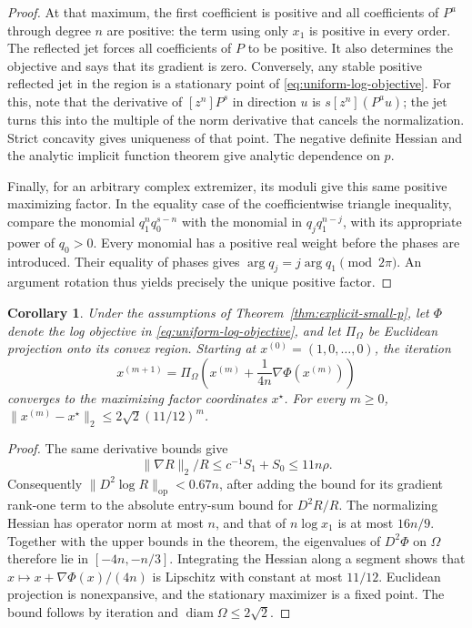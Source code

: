 \documentclass[11pt]{article}
\newtheorem{corollary}[theorem]{Corollary}
\begin{document}
\begin{proof}
At that maximum, the first coefficient is positive and all
coefficients of \(P^a\) through degree \(n\) are positive:
the term using only \(x_1\) is positive in every order.
The reflected jet forces all coefficients of \(P\) to be
positive. It also determines the objective and says that its
gradient is zero. Conversely, any stable positive reflected
jet in the region is a stationary point of
\eqref{eq:uniform-log-objective}. For this, note that the
derivative of \([z^n]P^s\) in direction \(u\) is
\(s[z^n](P^a u)\); the jet turns this into the multiple of
the norm derivative that cancels the normalization.
Strict concavity gives uniqueness of that point.
The negative definite Hessian and the analytic implicit
function theorem give analytic dependence on \(p\).

Finally, for an arbitrary complex extremizer, its moduli
give this same positive maximizing factor. In the equality
case of the coefficientwise triangle inequality, compare
the monomial \(q_1^n q_0^{s-n}\) with the monomial in
\(q_jq_1^{n-j}\), with its appropriate power of \(q_0>0\).
Every monomial has a positive real weight before the phases
are introduced. Their equality of phases gives
\(\arg q_j=j\arg q_1 \pmod{2\pi}\).
An argument rotation thus yields precisely the unique
positive factor.
\end{proof}

\begin{corollary}\label{cor:uniform-iteration}
Under the assumptions of Theorem~\ref{thm:explicit-small-p},
let \(\Phi\) denote the log objective in
\eqref{eq:uniform-log-objective}, and let
\(\Pi_\Omega\) be Euclidean projection onto its convex region.
Starting at \(x^{(0)}=(1,0,\ldots,0)\), the iteration
\[
 x^{(m+1)}=\Pi_\Omega\left(x^{(m)}
       +\frac{1}{4n}\nabla\Phi(x^{(m)})\right)
\]
converges to the maximizing factor coordinates \(x^\star\).
For every \(m\geq0\),
\(\|x^{(m)}-x^\star\|_2\leq2\sqrt2(11/12)^m\).
\end{corollary}

\begin{proof}
The same derivative bounds give
\[\|\nabla R\|_2/R\leq c^{-1}S_1+S_0\leq11n\rho.\]
Consequently
\(\|D^2\log R\|_{\mathrm{op}}<0.67n\), after adding
the bound for its gradient rank-one term to the absolute
entry-sum bound for \(D^2R/R\).
The normalizing Hessian has operator norm at most \(n\),
and that of \(n\log x_1\) is at most \(16n/9\).
Together with the upper bounds in the theorem, the eigenvalues
of \(D^2\Phi\) on \(\Omega\) therefore lie in
\([-4n,-n/3]\).
Integrating the Hessian along a segment shows that
\(x\mapsto x+\nabla\Phi(x)/(4n)\) is Lipschitz with constant
at most \(11/12\). Euclidean projection is nonexpansive,
and the stationary maximizer is a fixed point.
The bound follows by iteration and \(\operatorname{diam}
\Omega\leq2\sqrt2\).
\end{proof}
\end{document}
